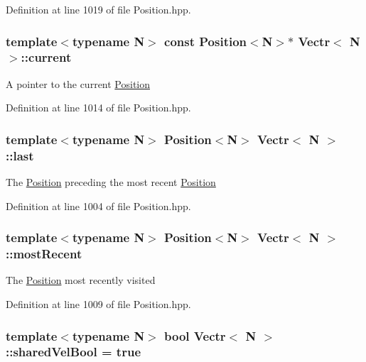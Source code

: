 Definition at line 1019 of file Position.\-hpp.

\hypertarget{struct_vectr_ae3215bf0713f2bb9a40f60c0215b4b83}{
\subsubsection[{current}]{\setlength{\rightskip}{0pt plus 5cm}template$<$typename N$>$ const {\bf Position}$<$N$>$$\ast$ {\bf Vectr}$<$ N $>$\-::current\hspace{0.3cm}{\ttfamily [protected]}}}\label{struct_vectr_ae3215bf0713f2bb9a40f60c0215b4b83}
A pointer to the current \hyperlink{struct_position}{Position} 

Definition at line 1014 of file Position.\-hpp.

\hypertarget{struct_vectr_a42723f75b3084b9285cbd205388ba90e}{
\subsubsection[{last}]{\setlength{\rightskip}{0pt plus 5cm}template$<$typename N$>$ {\bf Position}$<$N$>$ {\bf Vectr}$<$ N $>$\-::last\hspace{0.3cm}{\ttfamily [protected]}}}\label{struct_vectr_a42723f75b3084b9285cbd205388ba90e}
The \hyperlink{struct_position}{Position} preceding the most recent \hyperlink{struct_position}{Position} 

Definition at line 1004 of file Position.\-hpp.

\hypertarget{struct_vectr_a1ef69f90f664d37b4281a02d12b08693}{
\subsubsection[{most\-Recent}]{\setlength{\rightskip}{0pt plus 5cm}template$<$typename N$>$ {\bf Position}$<$N$>$ {\bf Vectr}$<$ N $>$\-::most\-Recent\hspace{0.3cm}{\ttfamily [protected]}}}\label{struct_vectr_a1ef69f90f664d37b4281a02d12b08693}
The \hyperlink{struct_position}{Position} most recently visited 

Definition at line 1009 of file Position.\-hpp.

\hypertarget{struct_vectr_a2dc13bbf566571029a2069a87d165b30}{
\subsubsection[{shared\-Vel\-Bool}]{\setlength{\rightskip}{0pt plus 5cm}template$<$typename N$>$ bool {\bf Vectr}$<$ N $>$\-::shared\-Vel\-Bool = true\hspace{0.3cm}{\ttfamily [protected]}}}\label{struct_vectr_a2dc13bbf566571029a2069a87d165b30}


